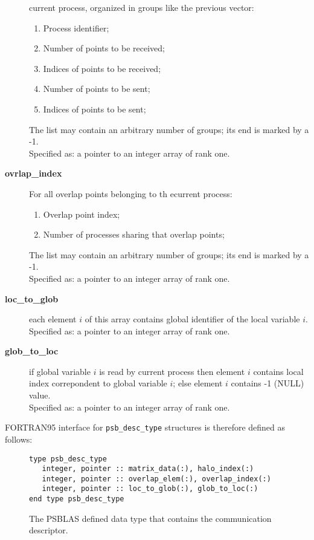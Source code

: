 \begin{description}
current process, organized in groups like the previous vector:
\begin{enumerate}
\item Process identifier;
\item Number of points to be received;
\item Indices of points to be received;
\item Number of points to be sent;
\item Indices of points to be sent;
\end{enumerate}
The list may contain an arbitrary number of groups; its end is marked
by a -1.\\
Specified as: a pointer to an integer array  of rank one.
\item [{\bf ovrlap\_index}] For all overlap points belonging to th
ecurrent process:
\begin{enumerate}
\item  Overlap point index;
\item  Number of processes sharing that overlap points;
\end{enumerate}
The list may contain an arbitrary number of groups; its end is marked
by a -1.\\
Specified as: a pointer to an integer array of rank one.
\item[{\bf loc\_to\_glob}] each element $i$ of this array contains
global identifier of the local variable $i$.\\
Specified as: a pointer to an integer array of rank one.
\item[{\bf glob\_to\_loc}]  if global variable $i$ is read by current
process then element $i$ contains local index correpondent to global variable $i$;
else element $i$ contains -1 (NULL) value.\\
Specified as: a pointer to an integer array of rank one.
\end{description}
FORTRAN95 interface for \verb|psb_desc_type| structures is therefore defined
as follows:
\begin{figure}[h!]
  \begin{Sbox}
    \begin{minipage}[tl]{0.9\textwidth}
\begin{verbatim} 
type psb_desc_type 
   integer, pointer :: matrix_data(:), halo_index(:)
   integer, pointer :: overlap_elem(:), overlap_index(:)
   integer, pointer :: loc_to_glob(:), glob_to_loc(:)
end type psb_desc_type 
\end{verbatim}
    \end{minipage}
  \end{Sbox}
  \setlength{\fboxsep}{8pt}
  \begin{center}
    \fbox{\TheSbox}
  \end{center}
  \caption{\label{fig:desctype}The PSBLAS defined data type that
    contains the communication descriptor.}
\end{figure}

